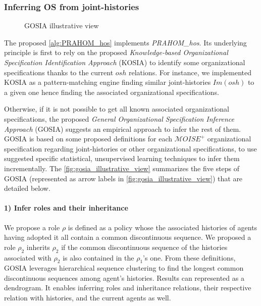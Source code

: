 \documentclass[runningheads]{llncs}
\newcounter{relation}
\begin{document}
\subsubsection{\textbf{Inferring OS from joint-histories}}

\label{alg:PRAHOM_hos}

\begin{figure}[h!]
    \centering
    
    \caption{GOSIA illustrative view}
    \label{fig:gosia_illustrative_view}
\end{figure}

The proposed \autoref{alg:PRAHOM_hos} implements \emph{PRAHOM\_hos}. Its underlying principle is first to rely on the proposed \emph{Knowledge-based Organizational Specification Identification Approach} (KOSIA) to identify some organizational specifications thanks to the current $osh$ relations. %
For instance, we implemented KOSIA as a pattern-matching engine finding similar joint-histories $Im(osh)$ to a given one hence finding the associated organizational specifications.

Otherwise, if it is not possible to get all known associated organizational specifications, the proposed \emph{General Organizational Specification Inference Approach} (GOSIA) suggests an empirical approach to infer the rest of them.
GOSIA is based on some proposed definitions for each $\mathcal{M}OISE^+$ organizational specification regarding joint-histories or other organizational specifications, to use suggested specific statistical, unsupervised learning techniques to infer them incrementally. The \autoref{fig:gosia_illustrative_view} summarizes the five steps of GOSIA (represented as arrow labels in \autoref{fig:gosia_illustrative_view}) that are detailed below.
%
\paragraph{1) Infer roles and their inheritance}

We propose a role $\rho$ is defined as a policy whose the associated histories of agents having adopted it all contain a common discontinuous sequence. We proposed a role $\rho_2$ inherits $\rho_2$ if the common discontinuous sequence of the histories associated with $\rho_2$ is also contained in the $\rho_1$'s one.
From these definitions, GOSIA leverages hierarchical sequence clustering to find the longest common discontinuous sequences among agent's histories. Results can represented as a dendrogram. It enables inferring roles and inheritance relations, their respective relation with histories, and the current agents as well.
\end{document}
